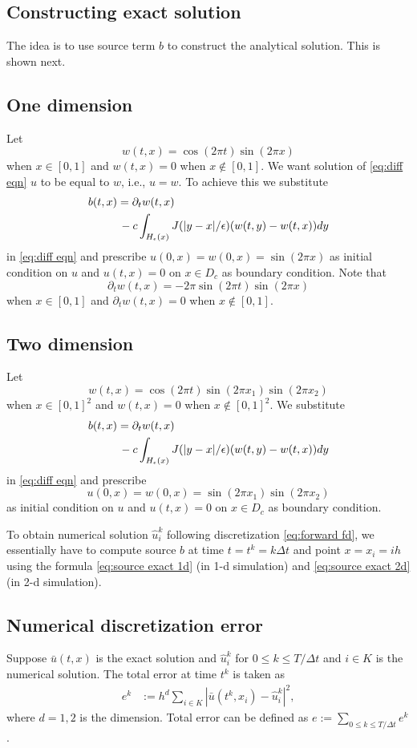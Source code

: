 \documentclass[11pt,twocolumn]{amsart}
\theoremstyle{definition}
\theoremstyle{definition}
\numberwithin{equation}{section}
\numberwithin{equation}{section}
\begin{document}
\begin{appendices}
\section{Constructing exact solution}
The idea is to use source term $b$ to construct the analytical solution. This is shown next.

\subsection{One dimension}
Let $$w(t,x) = \cos(2\pi t) \sin(2\pi x)$$ when $x\in [0,1]$ and $w(t,x) = 0$ when $x\notin [0,1]$. We want solution of \autoref{eq:diff eqn} $u$ to be equal to $w$, i.e., $u = w$. To achieve this we substitute 
\begin{align}\label{eq:source exact 1d}
b(t,x) &= \partial_t w(t,x) \notag \\
&\,-  c \int_{H_\epsilon(x)} J(|y-x|/\epsilon) (w(t,y) - w(t,x)) dy 
\end{align}
in \autoref{eq:diff eqn} and prescribe $u(0,x) = w(0,x) = \sin(2\pi x)$ as initial condition on $u$ and $u(t,x) = 0$ on $x\in D_c$ as boundary condition. Note that $$ \partial_t w(t,x) = -2\pi \sin(2\pi t) \sin(2\pi x) $$ when $x\in [0,1]$ and $\partial_t w(t,x) = 0$ when $x\notin [0,1]$.

\subsection{Two dimension}
Let $$w(t,x) = \cos(2\pi t) \sin(2\pi x_1)  \sin(2\pi x_2)$$ when $x\in [0,1]^2$ and $w(t,x) = 0$ when $x\notin [0,1]^2$. We substitute 
\begin{align}\label{eq:source exact 2d}
b(t,x) &= \partial_t w(t,x) \notag \\
&\, -  c \int_{H_\epsilon(x)} J(|y-x|/\epsilon) (w(t,y) - w(t,x)) dy 
\end{align}
in \autoref{eq:diff eqn} and prescribe $$u(0,x) = w(0,x) = \sin(2\pi x_1)\sin(2\pi x_2)$$ as initial condition on $u$ and $u(t,x) = 0$ on $x\in D_c$ as boundary condition. 

To obtain numerical solution $\hat{u}^k_i$ following discretization \autoref{eq:forward fd}, we essentially have to compute source $b$ at time $t=t^k = k\Delta t$ and point $x = x_i = ih$ using the formula \autoref{eq:source exact 1d} (in 1-d simulation) and \autoref{eq:source exact 2d} (in 2-d simulation).

\subsection{Numerical discretization error}
Suppose $\bar{u}(t,x)$ is the exact solution and $\hat{u}^k_i$ for $0\leq k \leq T/\Delta t$ and $i\in K$ is the numerical solution. The total error at time $t^k$ is taken as
\begin{align}\label{eq:err}
e^k &:= h^d \sum_{i\in K} |\bar{u}(t^k, x_i) - \hat{u}^k_i|^2,
\end{align}
where $d=1,2$ is the dimension. Total error can be defined as $e:= \sum_{0\leq k\leq T/\Delta t} e^k$.



\end{appendices}
\end{document}
